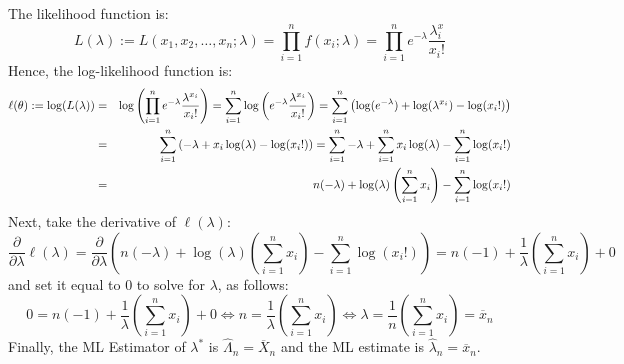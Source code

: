 {\begin{example}
The likelihood function is:
\[
L(\lambda) := L(x_1,x_2,\ldots,x_n; \lambda) = \prod_{i=1}^n f(x_i;\lambda) = \prod_{i=1}^n e^{-\lambda} \frac{\lambda^x_i}{x_i!}
\]
Hence, the log-likelihood function is:
\begin{eqnarray}
\ell(\theta) := \log(L(\lambda)) 
&=&  \log \left( \prod_{i=1}^n e^{-\lambda} \frac{\lambda^{x_i}}{x_i!} \right) =  \sum_{i=1}^n \log \left(  e^{-\lambda} \frac{\lambda^{x_i}}{x_i!} \right) 
=  \sum_{i=1}^n \left( \log (e^{-\lambda}) + \log( \lambda^{x_i}) - \log({x_i!}) \right)  \notag \\
&=& \sum_{i=1}^n \left({-\lambda} + x_i \log( \lambda) - \log({x_i!}) \right) 
= \sum_{i=1}^n {-\lambda} + \sum_{i=1}^n x_i \log( \lambda) - \sum_{i=1}^n \log({x_i!})  \notag \\
&=& n ( {-\lambda}) + \log( \lambda) \left( \sum_{i=1}^n x_i \right) - \sum_{i=1}^n \log({x_i!})  \notag 
\end{eqnarray}
Next, take the derivative of $\ell(\lambda)$:
\[
\frac{\partial}{\partial \lambda} \ell (\lambda) 
= \frac{\partial}{\partial \lambda} \left(  n ( {-\lambda}) + \log( \lambda) \left( \sum_{i=1}^n x_i \right) - \sum_{i=1}^n \log({x_i!})  \right)
= n(-1) + \frac{1}{\lambda} \left( \sum_{i=1}^n x_i \right) + 0
\]
and set it equal to $0$ to solve for $\lambda$, as follows:
\[
0 = n(-1) + \frac{1}{\lambda} \left( \sum_{i=1}^n x_i \right) + 0 \iff n = \frac{1}{\lambda} \left( \sum_{i=1}^n x_i \right) \iff \lambda =  \frac{1}{n} \left( \sum_{i=1}^n x_i \right) = \overline{x}_n
\]
Finally, the ML Estimator of $\lambda^*$ is $\widehat{\Lambda}_n = \overline{X}_n$ and the ML estimate is $\widehat{\lambda}_n = \overline{x}_n$.


\end{example}}

